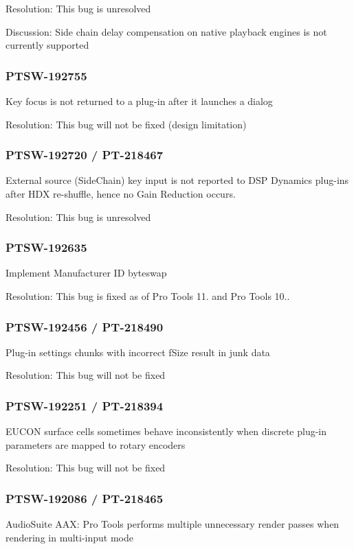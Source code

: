 Resolution\+: This bug is unresolved

Discussion\+: Side chain delay compensation on native playback engines is not currently supported\hypertarget{a00846_PTSW-192755}{}\subsubsection{P\+T\+S\+W-\/192755}\label{a00846_PTSW-192755}
Key focus is not returned to a plug-\/in after it launches a dialog

Resolution\+: This bug will not be fixed (design limitation)\hypertarget{a00846_PTSW-192720}{}\subsubsection{P\+T\+S\+W-\/192720 / P\+T-\/218467}\label{a00846_PTSW-192720}
External source (Side\+Chain) key input is not reported to D\+SP Dynamics plug-\/ins after H\+DX re-\/shuffle, hence no Gain Reduction occurs.

Resolution\+: This bug is unresolved\hypertarget{a00846_PTSW-192635}{}\subsubsection{P\+T\+S\+W-\/192635}\label{a00846_PTSW-192635}
Implement Manufacturer ID byteswap

Resolution\+: This bug is fixed as of Pro Tools 11. and Pro Tools 10..\hypertarget{a00846_PTSW-192456}{}\subsubsection{P\+T\+S\+W-\/192456 / P\+T-\/218490}\label{a00846_PTSW-192456}
Plug-\/in settings chunks with incorrect f\+Size result in junk data

Resolution\+: This bug will not be fixed\hypertarget{a00846_PTSW-192251}{}\subsubsection{P\+T\+S\+W-\/192251 / P\+T-\/218394}\label{a00846_PTSW-192251}
E\+U\+C\+ON surface cells sometimes behave inconsistently when discrete plug-\/in parameters are mapped to rotary encoders

Resolution\+: This bug will not be fixed\hypertarget{a00846_PTSW-192086}{}\subsubsection{P\+T\+S\+W-\/192086 / P\+T-\/218465}\label{a00846_PTSW-192086}
Audio\+Suite A\+AX\+: Pro Tools performs multiple unnecessary render passes when rendering in multi-\/input mode

